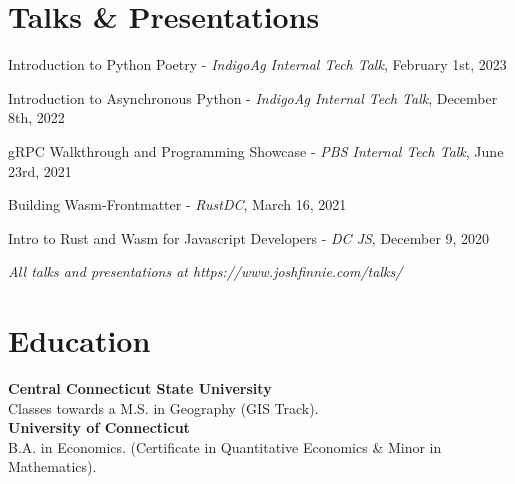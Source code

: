 \documentclass{bluefin_cv}
\begin{document}
\section{Talks \& Presentations}
\begin{bfcvlist}
    \item Introduction to Python Poetry - \textsl{IndigoAg Internal Tech Talk}, February 1st, 2023
    \item Introduction to Asynchronous Python - \textsl{IndigoAg Internal Tech Talk}, December 8th, 2022
    \item gRPC Walkthrough and Programming Showcase - \textsl{PBS Internal Tech Talk}, June 23rd, 2021
    \item Building Wasm-Frontmatter - \textsl{RustDC}, March 16, 2021
    \item Intro to Rust and Wasm for Javascript Developers - \textsl{DC JS}, December 9, 2020
\end{bfcvlist}
\smallskip
\centerline{\textsl{All talks and presentations at https://www.joshfinnie.com/talks/}}

\section{Education}
{\bf Central Connecticut State University}
\\ Classes towards a M.S. in Geography (GIS Track).\hfill\\
{\bf University of Connecticut}
\\ B.A. in Economics. (Certificate in Quantitative Economics \& Minor in Mathematics).\hfill\\

\end{document}
